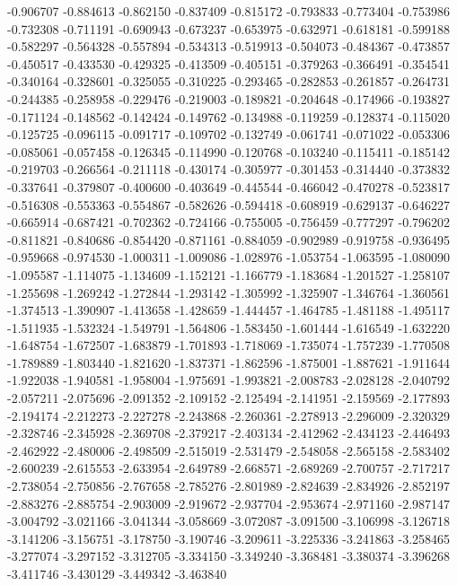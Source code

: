 -0.906707
-0.884613
-0.862150
-0.837409
-0.815172
-0.793833
-0.773404
-0.753986
-0.732308
-0.711191
-0.690943
-0.673237
-0.653975
-0.632971
-0.618181
-0.599188
-0.582297
-0.564328
-0.557894
-0.534313
-0.519913
-0.504073
-0.484367
-0.473857
-0.450517
-0.433530
-0.429325
-0.413509
-0.405151
-0.379263
-0.366491
-0.354541
-0.340164
-0.328601
-0.325055
-0.310225
-0.293465
-0.282853
-0.261857
-0.264731
-0.244385
-0.258958
-0.229476
-0.219003
-0.189821
-0.204648
-0.174966
-0.193827
-0.171124
-0.148562
-0.142424
-0.149762
-0.134988
-0.119259
-0.128374
-0.115020
-0.125725
-0.096115
-0.091717
-0.109702
-0.132749
-0.061741
-0.071022
-0.053306
-0.085061
-0.057458
-0.126345
-0.114990
-0.120768
-0.103240
-0.115411
-0.185142
-0.219703
-0.266564
-0.211118
-0.430174
-0.305977
-0.301453
-0.314440
-0.373832
-0.337641
-0.379807
-0.400600
-0.403649
-0.445544
-0.466042
-0.470278
-0.523817
-0.516308
-0.553363
-0.554867
-0.582626
-0.594418
-0.608919
-0.629137
-0.646227
-0.665914
-0.687421
-0.702362
-0.724166
-0.755005
-0.756459
-0.777297
-0.796202
-0.811821
-0.840686
-0.854420
-0.871161
-0.884059
-0.902989
-0.919758
-0.936495
-0.959668
-0.974530
-1.000311
-1.009086
-1.028976
-1.053754
-1.063595
-1.080090
-1.095587
-1.114075
-1.134609
-1.152121
-1.166779
-1.183684
-1.201527
-1.258107
-1.255698
-1.269242
-1.272844
-1.293142
-1.305992
-1.325907
-1.346764
-1.360561
-1.374513
-1.390907
-1.413658
-1.428659
-1.444457
-1.464785
-1.481188
-1.495117
-1.511935
-1.532324
-1.549791
-1.564806
-1.583450
-1.601444
-1.616549
-1.632220
-1.648754
-1.672507
-1.683879
-1.701893
-1.718069
-1.735074
-1.757239
-1.770508
-1.789889
-1.803440
-1.821620
-1.837371
-1.862596
-1.875001
-1.887621
-1.911644
-1.922038
-1.940581
-1.958004
-1.975691
-1.993821
-2.008783
-2.028128
-2.040792
-2.057211
-2.075696
-2.091352
-2.109152
-2.125494
-2.141951
-2.159569
-2.177893
-2.194174
-2.212273
-2.227278
-2.243868
-2.260361
-2.278913
-2.296009
-2.320329
-2.328746
-2.345928
-2.369708
-2.379217
-2.403134
-2.412962
-2.434123
-2.446493
-2.462922
-2.480006
-2.498509
-2.515019
-2.531479
-2.548058
-2.565158
-2.583402
-2.600239
-2.615553
-2.633954
-2.649789
-2.668571
-2.689269
-2.700757
-2.717217
-2.738054
-2.750856
-2.767658
-2.785276
-2.801989
-2.824639
-2.834926
-2.852197
-2.883276
-2.885754
-2.903009
-2.919672
-2.937704
-2.953674
-2.971160
-2.987147
-3.004792
-3.021166
-3.041344
-3.058669
-3.072087
-3.091500
-3.106998
-3.126718
-3.141206
-3.156751
-3.178750
-3.190746
-3.209611
-3.225336
-3.241863
-3.258465
-3.277074
-3.297152
-3.312705
-3.334150
-3.349240
-3.368481
-3.380374
-3.396268
-3.411746
-3.430129
-3.449342
-3.463840
